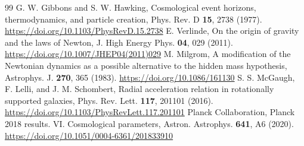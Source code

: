\documentclass[aps,prd,twocolumn,superscriptaddress,nofootinbib]{revtex4-2}
\begin{document}
\begin{thebibliography}{99}
 G. W. Gibbons and S. W. Hawking, Cosmological event horizons, thermodynamics, and particle creation, Phys. Rev. D \textbf{15}, 2738 (1977). \url{https://doi.org/10.1103/PhysRevD.15.2738}
 E. Verlinde, On the origin of gravity and the laws of Newton, J. High Energy Phys. \textbf{04}, 029 (2011). \url{https://doi.org/10.1007/JHEP04(2011)029}
 M. Milgrom, A modification of the Newtonian dynamics as a possible alternative to the hidden mass hypothesis, Astrophys. J. \textbf{270}, 365 (1983). \url{https://doi.org/10.1086/161130}
 S. S. McGaugh, F. Lelli, and J. M. Schombert, Radial acceleration relation in rotationally supported galaxies, Phys. Rev. Lett. \textbf{117}, 201101 (2016). \url{https://doi.org/10.1103/PhysRevLett.117.201101}
 Planck Collaboration, Planck 2018 results. VI. Cosmological parameters, Astron. Astrophys. \textbf{641}, A6 (2020). \url{https://doi.org/10.1051/0004-6361/201833910}
\end{thebibliography}
\end{document}
